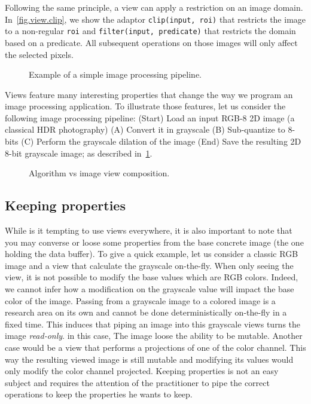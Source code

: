 Following the same principle, a view can apply a restriction on an image domain. In~\cref{fig.view.clip}, we show the
adaptor \texttt{clip(input, roi)} that restricts the image to a non-regular \texttt{roi} and \texttt{filter(input,
  predicate)} that restricts the domain based on a predicate. All subsequent operations on those images will only affect
the selected pixels.

\begin{figure}[tbh]
  
  \caption{Example of a simple image processing pipeline.}
  \label{fig.view.pipeline}
\end{figure}

Views feature many interesting properties that change the way we program an image processing application. To illustrate
those features, let us consider the following image processing pipeline: (Start) Load an input RGB-8 2D image (a
classical HDR photography) (A) Convert it in grayscale (B) Sub-quantize to 8-bits (C) Perform the grayscale dilation of
the image (End) Save the resulting 2D 8-bit grayscale image; as described in~\cref{fig.view.pipeline}.


\begin{figure}[tbh]
  \begin{minipage}{\linewidth}
    
  \end{minipage}
  \caption{Algorithm vs image view composition.}
  \label{fig.view.comp}
\end{figure}

\subsection{Keeping properties}

While is it tempting to use views everywhere, it is also important to note that you may converse or loose some
properties from the base concrete image (the one holding the data buffer). To give a quick example, let us consider a
classic RGB image and a view that calculate the grayscale on-the-fly. When only seeing the view, it is not possible to
modify the base values which are RGB colors. Indeed, we cannot infer how a modification on the grayscale value will
impact the base color of the image. Passing from a grayscale image to a colored image is a research area on its own and
cannot be done deterministically on-the-fly in a fixed time. This induces that piping an image into this grayscale views
turns the image \emph{read-only}. in this case, The image loose the ability to be mutable. Another case would be a view
that performs a projections of one of the color channel. This way the resulting viewed image is still mutable and
modifying its values would only modify the color channel projected. Keeping properties is not an easy subject and
requires the attention of the practitioner to pipe the correct operations to keep the properties he wants to keep.

